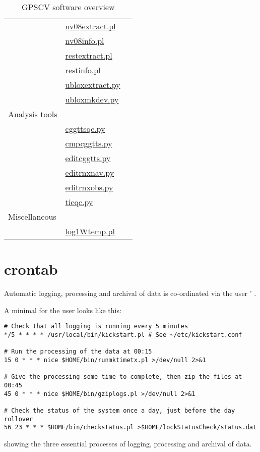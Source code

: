 \begin{table}
\begin{tabular}{l|l|l}
	& \hyperlink{h:nv08extract}{nv08extract.pl} & \\
	& \hyperlink{h:nv08info}{nv08info.pl} & \\
	& \hyperlink{h:restextract}{restextract.pl} & \\
	& \hyperlink{h:restinfo}{restinfo.pl} & \\
	& \hyperlink{h:ubloxextract}{ubloxextract.py} & \\
	& \hyperlink{h:ubloxmkdev}{ubloxmkdev.py} & \\
	\hline
Analysis tools & & \\
	& \hyperlink{h:cggttsqc}{cggttsqc.py} & \\
	& \hyperlink{h:cmpcggtts}{cmpcggtts.py} & \\
	& \hyperlink{h:editcggtts}{editcggtts.py} & \\
	& \hyperlink{h:editrnxnav}{editrnxnav.py} & \\
	& \hyperlink{h:editrnxobs}{editrnxobs.py} & \\
	& \hyperlink{h:ticqc}{ticqc.py} & \\
Miscellaneous & & \\
  & \hyperlink{h:log1Wtemp}{log1Wtemp.pl} & \\ 
	\hline
\end{tabular}
\caption{GPSCV software overview \label{t:OTTPSoftware} }
\end{table}

\section{crontab \label{ss:crontab}}

Automatic logging, processing and archival of data is co-ordinated via the user ' .

A minimal  for the user  looks like this:
\begin{lstlisting}
# Check that all logging is running every 5 minutes
*/5 * * * * /usr/local/bin/kickstart.pl # See ~/etc/kickstart.conf

# Run the processing of the data at 00:15
15 0 * * * nice $HOME/bin/runmktimetx.pl >/dev/null 2>&1 

# Give the processing some time to complete, then zip the files at 00:45
45 0 * * * nice $HOME/bin/gziplogs.pl >/dev/null 2>&1

# Check the status of the system once a day, just before the day rollover
56 23 * * * $HOME/bin/checkstatus.pl >$HOME/lockStatusCheck/status.dat
\end{lstlisting}
showing the three essential processes of logging, processing and archival of data.

